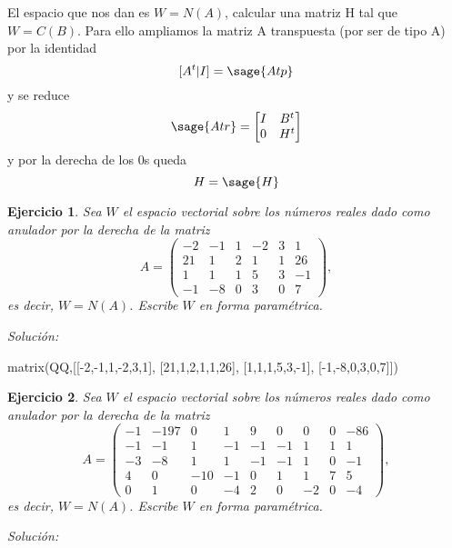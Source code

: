 \documentclass{amsart}
\newtheorem{ejer}{Ejercicio}
\begin{document}
El espacio que nos dan es $W = N(A)$, calcular una matriz H tal que $W = C(B)$. Para ello ampliamos la matriz A transpuesta (por ser de tipo A) por la identidad
$$
	[A^t|I] = \sage{Atp}
$$
y se reduce
$$
	\sage{Atr} = \begin{bmatrix}
		I & B^t \\
		0 & H^t \\
	\end{bmatrix}
$$
y por la derecha de los 0s queda
$$
	H = \sage{H}
$$





\begin{ejer} Sea $W$ el espacio vectorial sobre los números reales dado
como anulador por la derecha de la matriz 
\[A = \left(\begin{array}{rrrrrr}
-2 & -1 & 1 & -2 & 3 & 1 \\
21 & 1 & 2 & 1 & 1 & 26 \\
1 & 1 & 1 & 5 & 3 & -1 \\
-1 & -8 & 0 & 3 & 0 & 7
\end{array}\right),\]
es decir, $W = N(A)$. Escribe $W$ en forma param\'etrica.
\end{ejer}

{\it Soluci\'on:}

\begin{sageblock}
matrix(QQ,[[-2,-1,1,-2,3,1],
[21,1,2,1,1,26],
[1,1,1,5,3,-1],
[-1,-8,0,3,0,7]])
\end{sageblock}



\begin{ejer} Sea $W$ el espacio vectorial sobre los números reales dado
como anulador por la derecha de la matriz 
\[A = \left(\begin{array}{rrrrrrrrr}
-1 & -197 & 0 & 1 & 9 & 0 & 0 & 0 & -86 \\
-1 & -1 & 1 & -1 & -1 & -1 & 1 & 1 & 1 \\
-3 & -8 & 1 & 1 & -1 & -1 & 1 & 0 & -1 \\
4 & 0 & -10 & -1 & 0 & 1 & 1 & 7 & 5 \\
0 & 1 & 0 & -4 & 2 & 0 & -2 & 0 & -4
\end{array}\right),\]
es decir, $W = N(A)$. Escribe $W$ en forma param\'etrica.
\end{ejer}

{\it Soluci\'on:}
\end{document}
